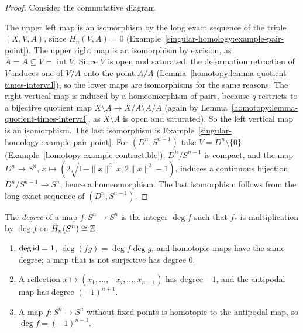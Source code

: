 \begin{proof}
Consider the commutative diagram
\begin{center}
\end{center}
The upper left map is an isomorphism by the long exact sequence of the triple $(X, V, A)$, since $H_n(V, A) = 0$ (Example~\ref{singular-homology:example-pair-point}). The
upper right map is an isomorphism by excision, as $\overline{A} = A \subseteq V = \operatorname{int}V$. Since $V$ is open and saturated, the deformation retraction of $V$
induces one of $V/A$ onto the point $A/A$ (Lemma~\ref{homotopy:lemma-quotient-times-interval}), so the lower maps are isomorphisms for the same reasons. The right
vertical map is induced by a homeomorphism of pairs, because $q$ restricts to a bijective quotient map $X \setminus A \to X/A \setminus A/A$ (again by
Lemma~\ref{homotopy:lemma-quotient-times-interval}, as $X \setminus A$ is open and saturated). So the left vertical map is an isomorphism. The last isomorphism is
Example~\ref{singular-homology:example-pair-point}. For $(D^n, S^{n-1})$ take $V = D^n \setminus \{0\}$ (Example~\ref{homotopy:example-contractible}); $D^n/S^{n-1}$ is
compact, and the map $D^n \to S^n$, $x \mapsto (2\sqrt{1 - \|x\|^2}\,x, 2\|x\|^2 - 1)$, induces a continuous bijection $D^n/S^{n-1} \to S^n$, hence a homeomorphism. The
last isomorphism follows from the long exact sequence of $(D^n, S^{n-1})$.
\end{proof}

\begin{definition}\label{singular-homology:definition-degree}
The \emph{degree} of a map $f \colon S^n \to S^n$ is the integer $\deg f$ such that $f_*$ is multiplication by $\deg f$ on $\tilde{H}_n(S^n) \cong \mathbb{Z}$.
\end{definition}

\begin{proposition}\label{singular-homology:proposition-degree}
\begin{enumerate}
\item $\deg \mathrm{id} = 1$, $\deg(fg) = \deg f \deg g$, and homotopic maps have the same degree; a map that is not surjective has degree $0$.
\item A reflection $x \mapsto (x_1, \ldots, -x_i, \ldots, x_{n+1})$ has degree $-1$, and the antipodal map has degree $(-1)^{n+1}$.
\item A map $f \colon S^n \to S^n$ without fixed points is homotopic to the antipodal map, so $\deg f = (-1)^{n+1}$.
\end{enumerate}
\end{proposition}


